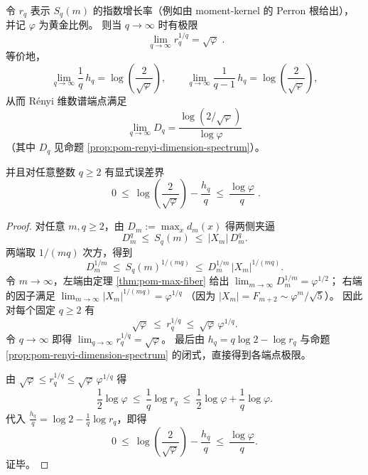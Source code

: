 \begin{proposition}\label{prop:pom-rq-qinfty-endpoint}
令 \(r_q\) 表示 \(S_q(m)\) 的指数增长率（例如由 moment-kernel 的 Perron 根给出），并记 \(\varphi\) 为黄金比例。
则当 \(q\to\infty\) 时有极限
\[
\boxed{\;
\lim_{q\to\infty} r_q^{1/q}=\sqrt{\varphi}\; }.
\]
等价地，
\[
\lim_{q\to\infty}\frac{1}{q}\,h_q
=\log\!\left(\frac{2}{\sqrt{\varphi}}\right),
\qquad
\lim_{q\to\infty}\frac{1}{q-1}\,h_q
=\log\!\left(\frac{2}{\sqrt{\varphi}}\right),
\]
从而 Rényi 维数谱端点满足
\[
\lim_{q\to\infty}D_q
=\frac{\log\!\left(2/\sqrt{\varphi}\right)}{\log\varphi}
\]
（其中 \(D_q\) 见命题 \ref{prop:pom-renyi-dimension-spectrum}）。
\par
并且对任意整数 \(q\ge 2\) 有显式误差界
\[
\boxed{\;
0\ \le\ \log\!\left(\frac{2}{\sqrt{\varphi}}\right)-\frac{h_q}{q}\ \le\ \frac{\log\varphi}{q}\; }.
\]
\end{proposition}
\begin{proof}
对任意 \(m,q\ge 2\)，由
\(
D_m:=\max_x d_m(x)
\)
得两侧夹逼
\[
D_m^q\ \le\ S_q(m)\ \le\ |X_m|\,D_m^q.
\]
两端取 \(1/(mq)\) 次方，得到
\[
D_m^{1/m}\ \le\ S_q(m)^{1/(mq)}\ \le\ D_m^{1/m}\,|X_m|^{1/(mq)}.
\]
令 \(m\to\infty\)，左端由定理 \ref{thm:pom-max-fiber} 给出
\(
\lim_{m\to\infty}D_m^{1/m}=\varphi^{1/2}
\)；
右端的因子满足
\(
\lim_{m\to\infty}|X_m|^{1/(mq)}=\varphi^{1/q}
\)
（因为 \(|X_m|=F_{m+2}\sim \varphi^m/\sqrt5\)）。
因此对每个固定 \(q\ge 2\) 有
\[
\sqrt{\varphi}\ \le\ r_q^{1/q}\ \le\ \sqrt{\varphi}\,\varphi^{1/q}.
\]
令 \(q\to\infty\) 即得 \(\lim_{q\to\infty}r_q^{1/q}=\sqrt{\varphi}\)。
最后由 \(h_q=q\log 2-\log r_q\) 与命题 \ref{prop:pom-renyi-dimension-spectrum} 的闭式，直接得到各端点极限。
\par
由 \(\sqrt{\varphi}\le r_q^{1/q}\le \sqrt{\varphi}\,\varphi^{1/q}\) 得
\[
\frac{1}{2}\log\varphi\ \le\ \frac{1}{q}\log r_q\ \le\ \frac{1}{2}\log\varphi+\frac{1}{q}\log\varphi.
\]
代入 \(\frac{h_q}{q}=\log 2-\frac{1}{q}\log r_q\)，即得
\[
0\ \le\ \log\!\left(\frac{2}{\sqrt{\varphi}}\right)-\frac{h_q}{q}\ \le\ \frac{\log\varphi}{q}.
\]
证毕。
\end{proof}

